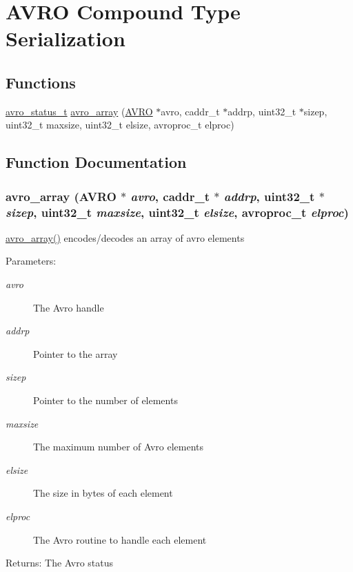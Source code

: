 \hypertarget{group___compound}{
\section{AVRO Compound Type Serialization}
\label{group___compound}
}
\subsection*{Functions}
\begin{CompactItemize}
\item 
\hyperlink{group___handle___routines_g4271ca78aabaaad628d7b632aa5a1499}{avro\_\-status\_\-t} \hyperlink{group___compound_g52f0a4383812a3d19a00f461ddb1a27c}{avro\_\-array} (\hyperlink{struct_a_v_r_o}{AVRO} $\ast$avro, caddr\_\-t $\ast$addrp, uint32\_\-t $\ast$sizep, uint32\_\-t maxsize, uint32\_\-t elsize, avroproc\_\-t elproc)
\end{CompactItemize}


\subsection{Function Documentation}
\hypertarget{group___compound_g52f0a4383812a3d19a00f461ddb1a27c}{
\subsubsection[{avro\_\-array}]{ avro\_\-array ({\bf AVRO} $\ast$ {\em avro}, \/  caddr\_\-t $\ast$ {\em addrp}, \/  uint32\_\-t $\ast$ {\em sizep}, \/  uint32\_\-t {\em maxsize}, \/  uint32\_\-t {\em elsize}, \/  avroproc\_\-t {\em elproc})}}
\label{group___compound_g52f0a4383812a3d19a00f461ddb1a27c}


\hyperlink{group___compound_g52f0a4383812a3d19a00f461ddb1a27c}{avro\_\-array()} encodes/decodes an array of avro elements \begin{Desc}
\item[Parameters:]
\begin{description}
\item[{\em avro}]The Avro handle \item[{\em addrp}]Pointer to the array \item[{\em sizep}]Pointer to the number of elements \item[{\em maxsize}]The maximum number of Avro elements \item[{\em elsize}]The size in bytes of each element \item[{\em elproc}]The Avro routine to handle each element \end{description}
\end{Desc}
\begin{Desc}
\item[Returns:]The Avro status \end{Desc}
